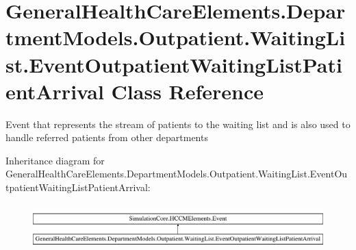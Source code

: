\hypertarget{class_general_health_care_elements_1_1_department_models_1_1_outpatient_1_1_waiting_list_1_1_eveb69cba3dbb99690008a282b7e42002d2}{}\section{General\+Health\+Care\+Elements.\+Department\+Models.\+Outpatient.\+Waiting\+List.\+Event\+Outpatient\+Waiting\+List\+Patient\+Arrival Class Reference}
\label{class_general_health_care_elements_1_1_department_models_1_1_outpatient_1_1_waiting_list_1_1_eveb69cba3dbb99690008a282b7e42002d2}


Event that represents the stream of patients to the waiting list and is also used to handle referred patients from other departments  


Inheritance diagram for General\+Health\+Care\+Elements.\+Department\+Models.\+Outpatient.\+Waiting\+List.\+Event\+Outpatient\+Waiting\+List\+Patient\+Arrival\+:\begin{figure}[H]
\begin{center}
\leavevmode
\includegraphics[height=1.741835cm]{class_general_health_care_elements_1_1_department_models_1_1_outpatient_1_1_waiting_list_1_1_eveb69cba3dbb99690008a282b7e42002d2}
\end{center}
\end{figure}
